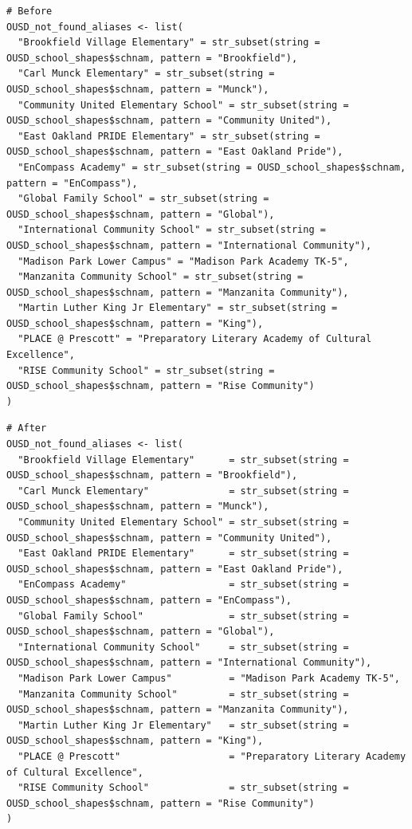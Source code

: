 \documentclass[
]{book}
\begin{document}
\begin{verbatim}
# Before
OUSD_not_found_aliases <- list(
  "Brookfield Village Elementary" = str_subset(string = OUSD_school_shapes$schnam, pattern = "Brookfield"),
  "Carl Munck Elementary" = str_subset(string = OUSD_school_shapes$schnam, pattern = "Munck"),
  "Community United Elementary School" = str_subset(string = OUSD_school_shapes$schnam, pattern = "Community United"),
  "East Oakland PRIDE Elementary" = str_subset(string = OUSD_school_shapes$schnam, pattern = "East Oakland Pride"),
  "EnCompass Academy" = str_subset(string = OUSD_school_shapes$schnam, pattern = "EnCompass"),
  "Global Family School" = str_subset(string = OUSD_school_shapes$schnam, pattern = "Global"),
  "International Community School" = str_subset(string = OUSD_school_shapes$schnam, pattern = "International Community"),
  "Madison Park Lower Campus" = "Madison Park Academy TK-5",
  "Manzanita Community School" = str_subset(string = OUSD_school_shapes$schnam, pattern = "Manzanita Community"),
  "Martin Luther King Jr Elementary" = str_subset(string = OUSD_school_shapes$schnam, pattern = "King"),
  "PLACE @ Prescott" = "Preparatory Literary Academy of Cultural Excellence",
  "RISE Community School" = str_subset(string = OUSD_school_shapes$schnam, pattern = "Rise Community")
)
\end{verbatim}

\begin{verbatim}
# After
OUSD_not_found_aliases <- list(
  "Brookfield Village Elementary"      = str_subset(string = OUSD_school_shapes$schnam, pattern = "Brookfield"),
  "Carl Munck Elementary"              = str_subset(string = OUSD_school_shapes$schnam, pattern = "Munck"),
  "Community United Elementary School" = str_subset(string = OUSD_school_shapes$schnam, pattern = "Community United"),
  "East Oakland PRIDE Elementary"      = str_subset(string = OUSD_school_shapes$schnam, pattern = "East Oakland Pride"),
  "EnCompass Academy"                  = str_subset(string = OUSD_school_shapes$schnam, pattern = "EnCompass"),
  "Global Family School"               = str_subset(string = OUSD_school_shapes$schnam, pattern = "Global"),
  "International Community School"     = str_subset(string = OUSD_school_shapes$schnam, pattern = "International Community"),
  "Madison Park Lower Campus"          = "Madison Park Academy TK-5",
  "Manzanita Community School"         = str_subset(string = OUSD_school_shapes$schnam, pattern = "Manzanita Community"),
  "Martin Luther King Jr Elementary"   = str_subset(string = OUSD_school_shapes$schnam, pattern = "King"),
  "PLACE @ Prescott"                   = "Preparatory Literary Academy of Cultural Excellence",
  "RISE Community School"              = str_subset(string = OUSD_school_shapes$schnam, pattern = "Rise Community")
)
\end{verbatim}
\end{document}
